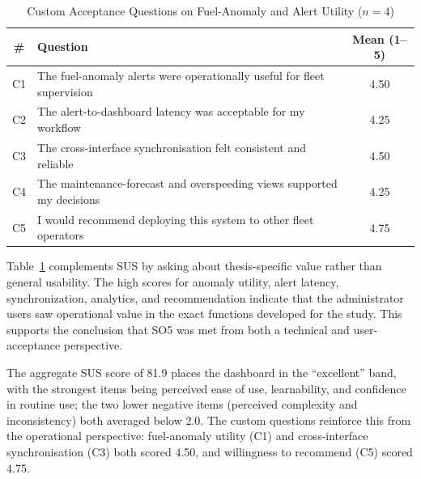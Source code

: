 \begin{table}[!htbp]
\centering
\caption{Custom Acceptance Questions on Fuel-Anomaly and Alert Utility ($n = 4$)}
\label{tab:so5_custom}
\scriptsize
\begin{tabular}{|c|p{}|c|}
\hline
\textbf{\#} & \textbf{Question} & \textbf{Mean (1--5)} \\
\hline
C1 & The fuel-anomaly alerts were operationally useful for fleet supervision & 4.50 \\
\hline
C2 & The alert-to-dashboard latency was acceptable for my workflow & 4.25 \\
\hline
C3 & The cross-interface synchronisation felt consistent and reliable & 4.50 \\
\hline
C4 & The maintenance-forecast and overspeeding views supported my decisions & 4.25 \\
\hline
C5 & I would recommend deploying this system to other fleet operators & 4.75 \\
\hline
\end{tabular}
\normalsize
\end{table}

Table~\ref{tab:so5_custom} complements SUS by asking about thesis-specific value rather than general usability. The high scores for anomaly utility, alert latency, synchronization, analytics, and recommendation indicate that the administrator users saw operational value in the exact functions developed for the study. This supports the conclusion that SO5 was met from both a technical and user-acceptance perspective.

The aggregate SUS score of 81.9 places the dashboard in the ``excellent'' band, with the strongest items being perceived ease of use, learnability, and confidence in routine use; the two lower negative items (perceived complexity and inconsistency) both averaged below 2.0. The custom questions reinforce this from the operational perspective: fuel-anomaly utility (C1) and cross-interface synchronisation (C3) both scored 4.50, and willingness to recommend (C5) scored 4.75.

